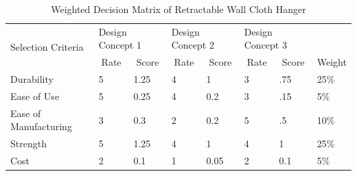 \documentclass[12pt,a4paper]{article}
\begin{document}
\renewcommand{\arraystretch}{3} %
\begin{table}[hbt!]
\caption{Weighted Decision Matrix of Retractable Wall Cloth Hanger}
\centering
\begin{tabular}{|l|l|l|l|l|l|l|l|}
\hline
\multirow{2}{*}{Selection Criteria}                        & \multicolumn{2}{p{40pt}|}{Design Concept 1}                  & \multicolumn{2}{p{40pt}|}{Design Concept 2}                  & \multicolumn{2}{p{40pt}|}{Design Concept 3}                  & \multicolumn{1}{p{20pt}|}{}                         \\ \cline{2-7}
                                                                                  & \multicolumn{1}{c|}{Rate} & \multicolumn{1}{c|}{Score} & \multicolumn{1}{c|}{Rate} & \multicolumn{1}{c|}{Score} & \multicolumn{1}{c|}{Rate} & \multicolumn{1}{c|}{Score} & \multicolumn{1}{c|}{\multirow{-2}{*}{Weight}} \\ \hline
Durability                                                                        & 5                         & 1.25                       & 4                         & 1                          & 3                         & .75                        & 25\%                                          \\ \hline
Ease of Use                                                                       & 5                         & 0.25                       & 4                         & 0.2                        & 3                         & .15                        & 5\%                                           \\ \hline
Ease of Manufacturing                                                             & 3                         & 0.3                        & 2                         & 0.2                        & 5                         & .5                         & 10\%                                          \\ \hline
Strength                                                                          & 5                         & 1.25                       & 4                         & 1                          & 4                         & 1                          & 25\%                                          \\ \hline
Cost                                                                              & 2                         & 0.1                        & 1                         & 0.05                       & 2                         & 0.1                        & 5\%                                           \\ \hline

\end{tabular}
\end{table}
\end{document}
